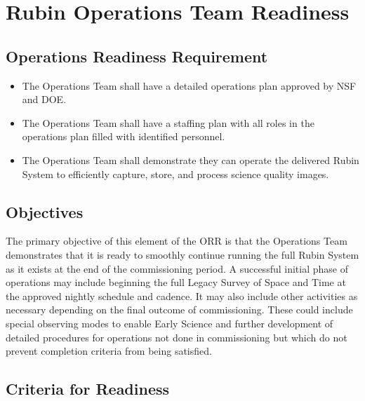 \section{Rubin Operations Team Readiness} \label{sec:ops}

\subsection{Operations Readiness Requirement}

\begin{itemize}

	\item The Operations Team shall have a detailed operations plan approved by NSF and DOE.
	\item The Operations Team shall have a staffing plan with all roles in the operations plan filled with identified personnel. 
	\item The Operations Team shall demonstrate they can operate the delivered Rubin System
to efficiently capture, store, and process science quality images.
	
\end{itemize}

\subsection{Objectives}

The primary objective of this element of the ORR is that the Operations Team demonstrates that it 
is ready to smoothly continue running the full Rubin System as it exists at the end of the 
commissioning period. A successful initial phase of operations may include beginning the full 
Legacy Survey of Space and Time at the approved nightly schedule and cadence. 
It may also include other activities as necessary depending on the final outcome of commissioning. 
These could include special observing modes to enable Early Science and further 
development of detailed procedures for operations not done in commissioning but which 
do not prevent completion criteria from being satisfied.  

\subsection{Criteria for Readiness}

